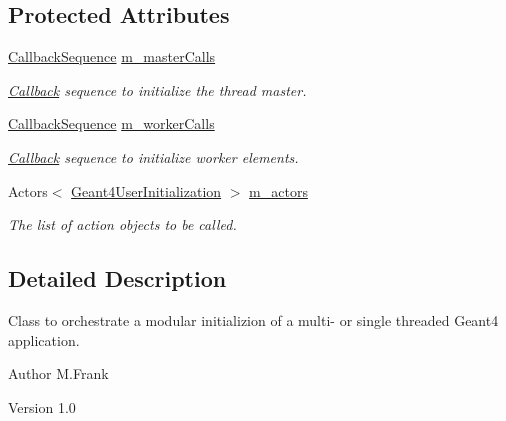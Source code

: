 \subsection*{Protected Attributes}
\begin{DoxyCompactItemize}
\item 
\hyperlink{struct_d_d4hep_1_1_callback_sequence}{CallbackSequence} \hyperlink{class_d_d4hep_1_1_simulation_1_1_geant4_user_initialization_sequence_a3a7aa9cf5219734877b0ab71da54bb29}{m\_\-masterCalls}
\begin{DoxyCompactList}\small\item\em \hyperlink{class_d_d4hep_1_1_callback}{Callback} sequence to initialize the thread master. \item\end{DoxyCompactList}\item 
\hyperlink{struct_d_d4hep_1_1_callback_sequence}{CallbackSequence} \hyperlink{class_d_d4hep_1_1_simulation_1_1_geant4_user_initialization_sequence_a85de09bfc3a69485391fb549a457cf7e}{m\_\-workerCalls}
\begin{DoxyCompactList}\small\item\em \hyperlink{class_d_d4hep_1_1_callback}{Callback} sequence to initialize worker elements. \item\end{DoxyCompactList}\item 
Actors$<$ \hyperlink{class_d_d4hep_1_1_simulation_1_1_geant4_user_initialization}{Geant4UserInitialization} $>$ \hyperlink{class_d_d4hep_1_1_simulation_1_1_geant4_user_initialization_sequence_a9239c0d702fcde97c6bc6387af30c09e}{m\_\-actors}
\begin{DoxyCompactList}\small\item\em The list of action objects to be called. \item\end{DoxyCompactList}\end{DoxyCompactItemize}


\subsection{Detailed Description}
Class to orchestrate a modular initializion of a multi-\/ or single threaded Geant4 application. \begin{DoxyAuthor}{Author}
M.Frank 
\end{DoxyAuthor}
\begin{DoxyVersion}{Version}
1.0 
\end{DoxyVersion}


